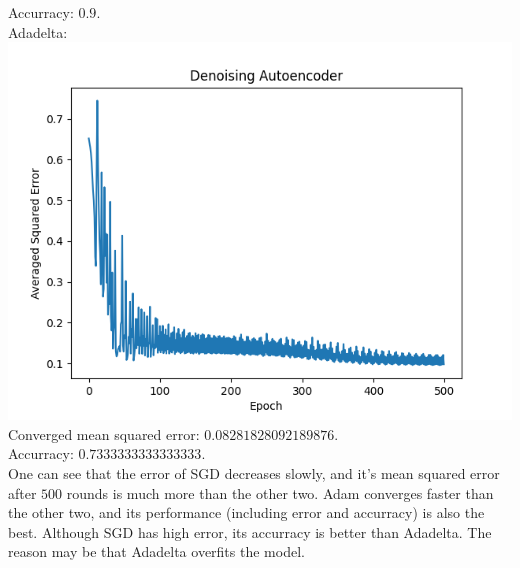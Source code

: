 Accurracy: $0.9$.\\\newpage
Adadelta:\\
\includegraphics[width=15cm]{adadelta.png}\\
Converged mean squared error: $0.08281828092189876$.\\
Accurracy: $0.7333333333333333$.\\
One can see that the error of SGD decreases slowly, and it's mean squared error after $500$ rounds is much more than the other two. Adam converges faster than the other two, and its performance (including error and accurracy) is also the best. Although SGD has high error, its accurracy is better than Adadelta. The reason may be that Adadelta overfits the model.
